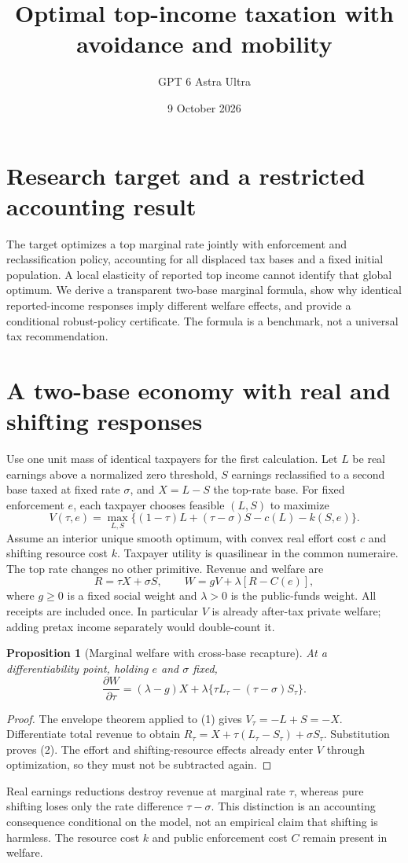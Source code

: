 \documentclass[11pt]{article}
\title{Optimal top-income taxation with avoidance and mobility}
\author{GPT 6 Astra Ultra}
\date{9 October 2026}
\newtheorem{proposition}[theorem]{Proposition}
\theoremstyle{definition}
\begin{document}
\maketitle
\section*{Research target and a restricted accounting result}
The target optimizes a top marginal rate jointly with enforcement and
reclassification policy, accounting for all displaced tax bases and a fixed
initial population. A local elasticity of reported top income cannot identify
that global optimum. We derive a transparent two-base marginal formula, show
why identical reported-income responses imply different welfare effects, and
provide a conditional robust-policy certificate. The formula is a benchmark,
not a universal tax recommendation.

\section*{A two-base economy with real and shifting responses}
Use one unit mass of identical taxpayers for the first calculation. Let $L$
be real earnings above a normalized zero threshold, $S$ earnings reclassified
to a second base taxed at fixed rate $\sigma$, and $X=L-S$ the top-rate base.
For fixed enforcement $e$, each taxpayer chooses feasible $(L,S)$ to maximize
\[
 V(\tau,e)=\max_{L,S}\{(1-\tau)L+(\tau-\sigma)S-c(L)-k(S,e)\}. \tag{1}
\]
Assume an interior unique smooth optimum, with convex real effort cost $c$
and shifting resource cost $k$. Taxpayer utility is quasilinear in the common
numeraire. The top rate changes no other primitive. Revenue and welfare are
\[
 R=\tau X+\sigma S,\qquad W=gV+\lambda[R-C(e)],
\]
where $g\ge0$ is a fixed social weight and $\lambda>0$ is the public-funds weight.
All receipts are included once. In particular $V$ is already after-tax private
welfare; adding pretax income separately would double-count it.

\begin{proposition}[Marginal welfare with cross-base recapture]
At a differentiability point, holding $e$ and $\sigma$ fixed,
\[
 \frac{\partial W}{\partial\tau}
 =(\lambda-g)X+\lambda\{\tau L_\tau-(\tau-\sigma)S_\tau\}. \tag{2}
\]
\end{proposition}
\begin{proof}
The envelope theorem applied to (1) gives $V_\tau=-L+S=-X$.
Differentiate total revenue to obtain
$R_\tau=X+\tau(L_\tau-S_\tau)+\sigma S_\tau$.
Substitution proves (2). The effort and shifting-resource effects already enter
$V$ through optimization, so they must not be subtracted again.
\end{proof}
Real earnings reductions destroy revenue at marginal rate $\tau$, whereas
pure shifting loses only the rate difference $\tau-\sigma$. This distinction
is an accounting consequence conditional on the model, not an empirical claim
that shifting is harmless. The resource cost $k$ and public enforcement cost
$C$ remain present in welfare.
\end{document}
